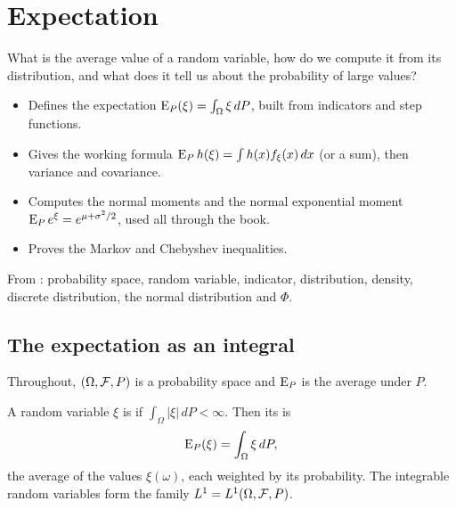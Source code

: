 \chapter{Expectation}
\label{ch:expectation}

\begin{question}
What is the average value of a random variable, how do we compute it from its distribution, and what does it tell us about the probability of large values?
\end{question}

\begin{whatfor}
\begin{itemize}
  \item Defines the expectation $\operatorname{E}_P(\xi)=\int_\Omega\xi\,dP$, built from indicators and step functions.
  \item Gives the working formula $\operatorname{E}_P h(\xi)=\int h(x)f_\xi(x)\,dx$ (or a sum), then variance and covariance.
  \item Computes the normal moments and the normal exponential moment $\operatorname{E}_P e^{\xi}=e^{\mu+\sigma^2/2}$, used all through the book.
  \item Proves the Markov and Chebyshev inequalities.
\end{itemize}
\end{whatfor}

\begin{prereq}
From : probability space, random variable, indicator, distribution, density, discrete distribution, the normal distribution and $\Phi$.
\end{prereq}

\section{The expectation as an integral}

Throughout, $(\Omega,\mathcal F,P)$ is a probability space and $\operatorname{E}_P$ is the average under $P$.

\begin{definition}
\label{def:expectation}
A random variable $\xi$ is  if $\int_\Omega|\xi|\,dP<\infty$. Then its  is
\[
  \operatorname{E}_P(\xi)=\int_\Omega\xi\,dP,
\]
the average of the values $\xi(\omega)$, each weighted by its probability. The integrable random variables form the family $L^1=L^1(\Omega,\mathcal F,P)$.
\end{definition}

